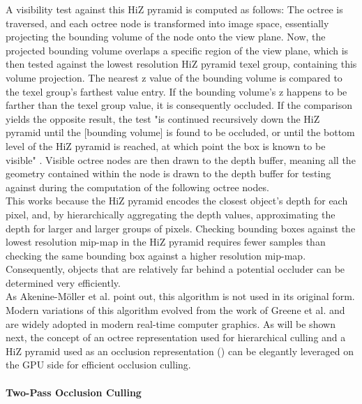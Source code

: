 \noindent
A visibility test against this \ac{HiZ} pyramid is computed as follows: The octree is traversed, and each octree node 
is transformed into image space, essentially projecting the bounding volume of the node onto the view plane. Now, 
the projected bounding volume overlaps a specific region of the view plane, which is then tested against the lowest 
resolution \ac{HiZ} pyramid texel group, containing this volume projection. The nearest z value of the bounding volume is 
compared to the texel group's farthest value entry. If the bounding volume's z happens to be farther than the 
texel group value, it is consequently occluded. If the comparison yields the opposite result, the test "is continued 
recursively down the \ac{HiZ} pyramid until the [bounding volume] is found to be occluded, or until the bottom level of the 
\ac{HiZ} pyramid is reached, at which point the box is known to be visible" \cite{AkenineMoeller2018}. Visible octree nodes 
are then drawn to the depth buffer, meaning all the geometry contained within the node is drawn to the depth buffer 
for testing against during the computation of the following octree nodes.\\

\noindent
This works because the \ac{HiZ} pyramid encodes the closest object's depth for each pixel, and, by hierarchically 
aggregating the depth values, approximating the depth for larger and larger groups of pixels. Checking bounding boxes 
against the lowest resolution mip-map in the \ac{HiZ} pyramid requires fewer samples than checking the same bounding 
box against a higher resolution mip-map. Consequently, objects that are relatively far behind a potential occluder 
can be determined very efficiently. \\

\noindent 
As Akenine-Möller et al. \cite{AkenineMoeller2018} point out, this algorithm is not used in its original form. 
Modern variations of this algorithm evolved from the work of Greene et al. \cite{Greene93} and are widely adopted in 
modern real-time computer graphics. As will be shown next, the concept of an octree representation used for 
hierarchical culling and a \ac{HiZ} pyramid used as an occlusion representation (\cite{AkenineMoeller2018}) can be elegantly 
leveraged on the \ac{GPU} side for efficient occlusion culling.


\paragraph*{Two-Pass Occlusion Culling} \label{subsubsec-two-pass-occlusion-culling}

